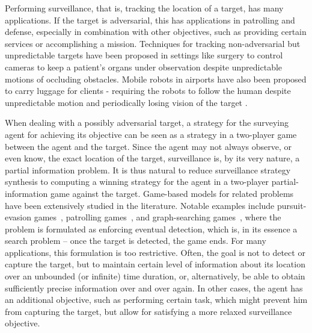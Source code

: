 
Performing surveillance, that is, tracking the location of a target, has many applications. If the target is adversarial, this has applications  in patrolling and defense, especially in combination with other objectives, such as providing certain services or accomplishing a mission. Techniques for tracking non-adversarial but unpredictable targets have been proposed in settings like surgery to control cameras to keep a patient's organs under observation despite unpredictable motions of occluding obstacles. Mobile robots in airports have also been proposed to carry luggage for clients - requiring the robots to follow the human despite unpredictable motion and periodically losing vision of the target \cite{GonBanos02}. 

When dealing with a possibly adversarial target, a strategy for the surveying agent for achieving its objective can be seen as a strategy in a two-player game between the agent and the target. Since the agent may not always observe, or even know, the exact location of the target, surveillance is, by its very nature, a partial information problem.
It is thus natural to reduce surveillance strategy synthesis to computing a winning strategy for the agent in a two-player partial-information game against the target. Game-based models for related problems have been extensively studied in the literature. Notable examples include pursuit-evasion games~\cite{Chung2011}, patrolling games~\cite{Basilico12}, and graph-searching games~\cite{Kreutzer11}, where the problem is formulated as enforcing eventual detection, which is, in its essence a search problem -- once the target is detected, the game ends. For many applications, this formulation is too restrictive. Often, the goal is not to detect or capture the target, but to maintain certain level of information about its location over an unbounded (or infinite) time duration, or, alternatively, be able to obtain sufficiently precise information over and over again. In other cases, the agent has an additional objective, such as performing certain task, which might prevent him from capturing the target, but allow for satisfying a more relaxed surveillance objective.

